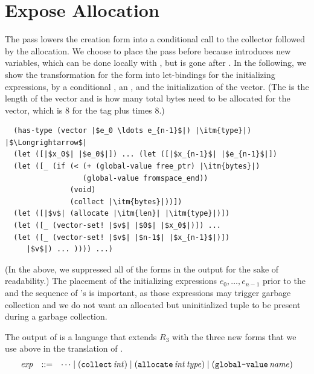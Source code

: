 \documentclass[11pt]{book}
\begin{document}
\section{Expose Allocation}
\label{sec:expose-allocation}

The pass  lowers the  creation
form into a conditional call to the collector followed by the
allocation. We choose to place the  pass
before  because  introduces new
variables, which can be done locally with , but 
is gone after .  In the following, we show the
transformation for the  form into let-bindings for the
initializing expressions, by a conditional , an
, and the initialization of the vector.
(The  is the length of the vector and  is how many
total bytes need to be allocated for the vector, which is 8 for the
tag plus  times 8.)

\begin{lstlisting}
  (has-type (vector |$e_0 \ldots e_{n-1}$|) |\itm{type}|)
|$\Longrightarrow$|
  (let ([|$x_0$| |$e_0$|]) ... (let ([|$x_{n-1}$| |$e_{n-1}$|])
  (let ([_ (if (< (+ (global-value free_ptr) |\itm{bytes}|)
                  (global-value fromspace_end))
               (void)
               (collect |\itm{bytes}|))])
  (let ([|$v$| (allocate |\itm{len}| |\itm{type}|)])
  (let ([_ (vector-set! |$v$| |$0$| |$x_0$|)]) ...
  (let ([_ (vector-set! |$v$| |$n-1$| |$x_{n-1}$|)])
     |$v$|) ... )))) ...)
\end{lstlisting}
(In the above, we suppressed all of the  forms in the
output for the sake of readability.)  The placement of the initializing
expressions $e_0,\ldots,e_{n-1}$ prior to the  and
the sequence of 's is important, as those expressions
may trigger garbage collection and we do not want an allocated but
uninitialized tuple to be present during a garbage collection.

The output of  is a language that extends
$R_3$ with the three new forms that we use above in the translation of
.
\[
\begin{array}{lcl}
  \mathit{exp} &::=& \cdots
      \mid (\texttt{collect} \,\mathit{int})
      \mid (\texttt{allocate} \,\mathit{int}\,\mathit{type})
      \mid (\texttt{global-value} \,\mathit{name})
\end{array}
\]

%
\end{document}
